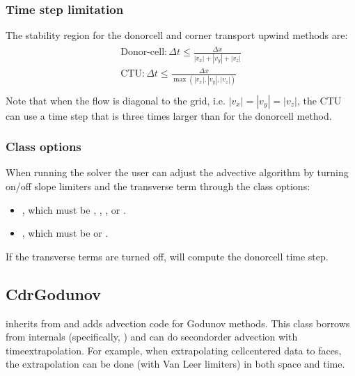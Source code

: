 \documentclass[letterpaper,10pt,english]{sphinxmanual}
\begin{document}
\subsubsection{Time step limitation}
\label{\detokenize{Solvers/CDR:time-step-limitation}}\label{\detokenize{Solvers/CDR:chap-ctustep}}
The stability region for the donor\sphinxhyphen{}cell and corner transport upwind methods are:
\begin{align*}\!\begin{aligned}
\text{Donor-cell}: \Delta t \leq \frac{\Delta x}{|v_x| + |v_y| + |v_z|}\\
\text{CTU}: \Delta t \leq \frac{\Delta x}{\max\left(|v_x|,|v_y|,|v_z|\right)}\\
\end{aligned}\end{align*}
Note that when the flow is diagonal to the grid, i.e. \(|v_x| = |v_y| = |v_z|\), the CTU can use a time step that is three times larger than for the donor\sphinxhyphen{}cell method.


\subsubsection{Class options}
\label{\detokenize{Solvers/CDR:class-options}}
When running the  solver the user can adjust the advective algorithm by turning on/off slope limiters and the transverse term through the class options:
\begin{itemize}
\item {} 
, which must be , , , or .

\item {} 
, which must be  or .

\end{itemize}

If the transverse terms are turned off,  will compute the donor\sphinxhyphen{}cell time step.


\subsection{CdrGodunov}
\label{\detokenize{Solvers/CDR:cdrgodunov}}\label{\detokenize{Solvers/CDR:chap-cdrgodunov}}
 inherits from  and adds advection code for Godunov methods.
This class borrows from  internals (specifically, ) and can do second\sphinxhyphen{}order advection with time\sphinxhyphen{}extrapolation.
For example, when extrapolating cell\sphinxhyphen{}centered data to faces, the extrapolation can be done (with Van Leer limiters) in both space and time.
\end{document}

